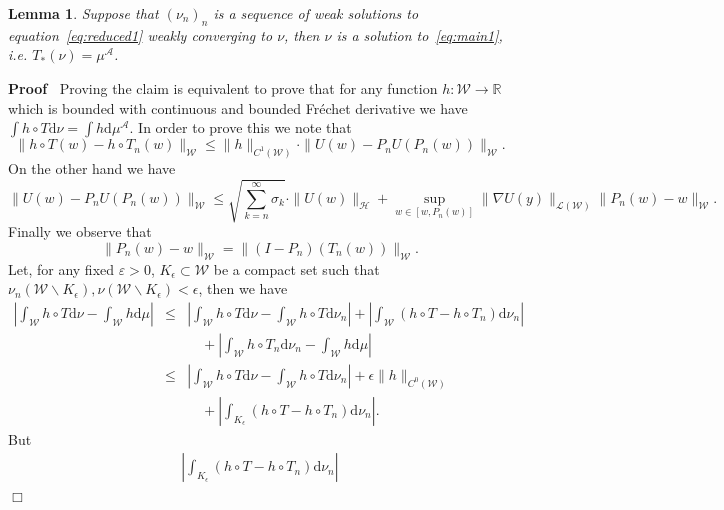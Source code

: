 \documentclass[a4paper,10pt]{article}
\newcommand{\asterisk}{\mathord{*}}
\newcommand{\mathd}{\mathrm{d}}
\newenvironment{proof}{\noindent\textbf{Proof\ }}{\hspace*{\fill}$\Box$\medskip}
\newtheorem{lemma}[theorem]{Lemma}
\begin{document}
\begin{lemma}
  \label{lemma_reduced4}Suppose that $(\nu_n)_n$ is a sequence of weak
  solutions to equation~{\eqref{eq:reduced1}} weakly converging to $\nu$, then
  $\nu$ is a solution to~{\eqref{eq:main1}}, i.e. $T_{\asterisk} (\nu) =
  \mu^{\mathcal{A}}$.
\end{lemma}

\begin{proof}
  Proving the claim is equivalent to prove that for any function $h :
  \mathcal{W} \rightarrow \mathbb{R}$ which is bounded with continuous and
  bounded Fr{\'e}chet derivative we have $\int h \circ T \mathd \nu = \int h
  \mathd \mu^{\mathcal{A}}$. In order to prove this we note that
  \[ \| h \circ T (w) - h \circ T_n (w) \|_{\mathcal{W}} \leqslant \| h
     \|_{C^1 (\mathcal{W})} \cdot \| U (w) - P_n U (P_n (w)) \|_{\mathcal{W}}
     . \]
  On the other hand we have
  \[ \| U (w) - P_n U (P_n (w)) \|_{\mathcal{W}} \leqslant \sqrt{\sum_{k =
     n}^{\infty} \sigma_k} \cdot \| U (w) \|_{\mathcal{H}} + \sup_{w \in [w,
     P_n (w)]} \| \nabla U (y) \|_{\mathcal{L} (\mathcal{W})} \| P_n (w) - w
     \|_{\mathcal{W}} . \]
  Finally we observe that
  \[ \| P_n (w) - w \|_{\mathcal{W}} = \| (I - P_n) (T_n (w)) \|_{\mathcal{W}}
     . \]
  Let, for any fixed $\varepsilon > 0$, $K_{\epsilon} \subset \mathcal{W}$ be
  a compact set such that $\nu_n (\mathcal{W} \backslash K_{\epsilon}), \nu
  (\mathcal{W} \backslash K_{\epsilon}) < \epsilon$, then we have
  \begin{eqnarray}
    \left| \int_{\mathcal{W}} h \circ T \mathd \nu - \int_{\mathcal{W}} h
    \mathd \mu \right| & \leqslant & \left| \int_{\mathcal{W}} h \circ T
    \mathd \nu - \int_{\mathcal{W}} h \circ T \mathd \nu_n \right| + \left|
    \int_{\mathcal{W}} (h \circ T - h \circ T_n) \mathd \nu_n \right|
    \nonumber\\
    &  & \quad + \left| \int_{\mathcal{W}} h \circ T_n \mathd \nu_n -
    \int_{\mathcal{W}} h \mathd \mu \right| \nonumber\\
    & \leqslant & \left| \int_{\mathcal{W}} h \circ T \mathd \nu -
    \int_{\mathcal{W}} h \circ T \mathd \nu_n \right| + \epsilon \| h \|_{C^0
    (\mathcal{W})} \nonumber\\
    &  & \quad + \left| \int_{K_{\epsilon}} (h \circ T - h \circ T_n) \mathd
    \nu_n \right| .  \label{eq:reduced5}
  \end{eqnarray}
  But
  \begin{eqnarray}
    \left| \int_{K_{\epsilon}} (h \circ T - h \circ T_n) \mathd \nu_n \right|

\end{eqnarray}
\end{proof}
\end{document}
